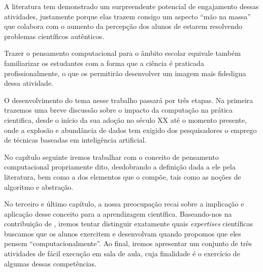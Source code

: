 A literatura tem demonstrado um surpreendente potencial de engajamento dessas atividades, justamente porque elas trazem consigo um aspecto ``mão na massa'' que colabora com o aumento da percepção dos alunos de estarem resolvendo problemas científicos autênticos.

Trazer o pensamento computacional para o âmbito escolar equivale também familiarizar os  estudantes com a forma que a ciência é praticada profissionalmente, o que os permitirão  desenvolver um imagem mais fidedigna dessa atividade.   

O desenvolvimento do tema nesse trabalho passará por três etapas. Na primeira trazemos uma breve discussão sobre o impacto da computação na prática cientifica, desde o início da sua adoção no século XX até o momento presente, onde a explosão e abundância de dados tem exigido dos pesquisadores o emprego de técnicas baseadas em inteligência artificial.

No capítulo seguinte iremos trabalhar com o conceito de pensamento computacional propriamente dito, desdobrando a definição dada a ele pela literatura, bem como a dos elementos que o compõe, tais como as noções de algoritmo e abstração.

No terceiro e último capítulo, a nossa preocupação recai sobre a implicação e aplicação desse conceito para a aprendizagem científica. Baseando-nos na contribuição de , iremos tentar distinguir exatamente quais \textit{expertises} científicas buscamos que os alunos exercitem e desenvolvam quando propomos que eles pensem ``computacionalmente''. Ao final, iremos apresentar um conjunto de três atividades de fácil execução em sala de aula, cuja finalidade é o exercício de algumas dessas competências. 
















